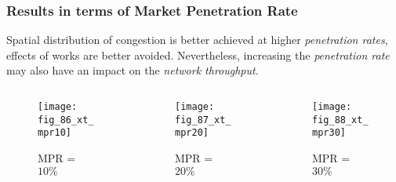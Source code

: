 \begin{frame}
\frametitle{Results in terms of Market Penetration Rate}
Spatial distribution of congestion is better achieved at higher \emph{penetration rates}, effects of works are better avoided. Nevertheless, increasing the \emph{penetration rate} may also have an impact on the \emph{network throughput}.
\begin{center}
\begin{columns}
    \begin{column}{0.3\textwidth}
    \begin{figure}
        \centering
        \texttt{[image: fig\_86\_xt\_mpr10]}
        \caption{MPR = $10\%$}
    \end{figure}
    \end{column}
    \begin{column}{0.3\textwidth}
        \begin{figure}
            \centering
            \texttt{[image: fig\_87\_xt\_mpr20]}
            \caption{MPR = $20\%$}
        \end{figure}
    \end{column}
    \begin{column}{0.3\textwidth}
        \begin{figure}
            \centering
            \texttt{[image: fig\_88\_xt\_mpr30]}
            \caption{MPR = $30\%$}
        \end{figure}
    \end{column}
\end{columns}
\end{center}
\end{frame}